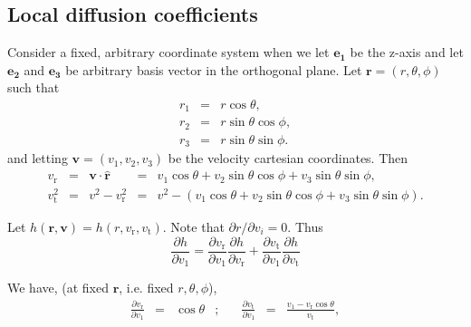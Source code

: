 \documentclass[11pt]{article}
\newcommand{\rt}{\mathrm{t}}
\newcommand{\rr}{\mathrm{r}}
\newcommand{\vr}{v_{\rr}}
\newcommand{\vt}{v_{\rt}}
\newcommand{\e}[1]{\boldsymbol{e_{#1}}}
\newcommand{\bv}{\boldsymbol{v}}
\newcommand{\br}{\boldsymbol{r}}
\newcommand{\hr}{\hat{\br}}
\begin{document}
\begin{appendices}

\section{Local diffusion coefficients}
\label{app:LocDiffCoeffs_Computation}
Consider a fixed, arbitrary coordinate system when we let $\e1$ be the z-axis and let $\e2$ and $\e3$ be arbitrary basis vector in the orthogonal plane. Let $\br = (r,\theta,\phi)$ such that
\begin{equation}
\begin{array}{ccl}
 r_{1} & =& \displaystyle{r\cos\theta} ,\\
  
 r_{2} & =&\displaystyle{r\sin\theta\cos\phi} ,\\

 r_{3} &=& \displaystyle{r\sin\theta\sin\phi} .
\end{array}
\label{eq:r_coord}
\end{equation}
and letting $\bv=(v_{1},v_{2},v_{3})$ be the velocity cartesian coordinates. Then
\begin{equation}
\begin{array}{cclcl}
 \vr &=& \bv \cdot\hr &=& \displaystyle{v_{1}\cos\theta+v_{2}\sin\theta\cos\phi+v_{3}\sin\theta\sin\phi} ,\\

 \vt^{2} &=& v^{2}-\vr^{2} &=& \displaystyle{v^{2}-(v_{1}\cos\theta+v_{2}\sin\theta\cos\phi+v_{3}\sin\theta\sin\phi)} .
\end{array}
\label{eq:vRadTan_coord}
\end{equation}

Let $h(\br,\bv)=h(r,\vr,\vt)$. Note that
${\partial r}/{\partial v_{i}}=0$. Thus
\begin{equation}
\frac{\partial h}{\partial v_{1}}=\frac{\partial \vr}{\partial v_{1}}\frac{\partial h}{\partial \vr}+\frac{\partial \vt}{\partial v_{1}}\frac{\partial h}{\partial \vt}
\label{eq:partial1_h}
\end{equation}

We have, (at fixed $\br$, i.e. fixed  $r,\theta,\phi$),
\begin{equation}
\begin{array}{cclcccl}
 \displaystyle{\frac{\partial\vr}{\partial v_{1}}}&=& \displaystyle{\cos\theta} &;\quad& \displaystyle{\frac{\partial \vt}{\partial v_{1}}} &=& \displaystyle{\frac{v_{1}-\vr\cos\theta}{\vt}},\\



\end{array}
\end{equation}
\end{appendices}
\end{document}
